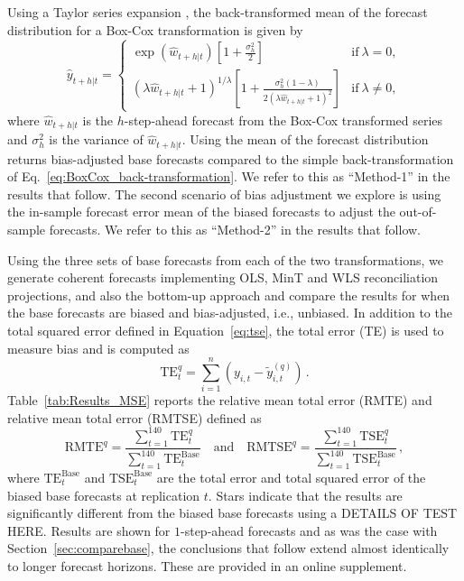 \documentclass[12pt]{article}
\theoremstyle{definition}
\begin{document}
Using a Taylor series expansion \citep{guerrero1993time}, the back-transformed mean of the forecast distribution for a Box-Cox transformation is given by
\begin{equation}\label{eq:BoxCox_BT_biasadj}
  \hat{y}_{t+h|t} =
    \begin{cases}
      \exp(\hat{w}_{t+h|t})\left[1+\frac{\sigma_h^2}{2}\right] & \text{if}~\lambda = 0, \\
      (\lambda \hat{w}_{t+h|t} + 1)^{1/\lambda}
        \left[1 + \frac{\sigma_h^2(1-\lambda)}{2(\lambda \hat{w}_{t+h|t} + 1)^2}\right]
                                                      & \text{if}~\lambda \ne 0,
\end{cases}
\end{equation}
where $\hat{w}_{t+h|t}$ is the $h$-step-ahead forecast from the Box-Cox transformed series and $\sigma_h^2$ is the variance of $\hat{w}_{t+h|t}$. Using the mean of the forecast distribution returns bias-adjusted base forecasts compared to the simple back-transformation of Eq.~\eqref{eq:BoxCox_back-transformation}. We refer to this as ``Method-1'' in the results that follow. The second scenario of bias adjustment we explore is using the in-sample forecast error mean of the biased forecasts to adjust the out-of-sample forecasts. We refer to this as ``Method-2'' in the results that follow.

Using the three sets of base forecasts from each of the two transformations, we generate coherent forecasts implementing OLS, MinT and WLS reconciliation projections, and also the bottom-up approach and compare the results for when the base forecasts are biased and bias-adjusted, i.e., unbiased. {\color{blue} In addition to the total squared error defined in Equation~\ref{eq:tse}, the total error (TE) is used to measure bias and is computed as
\begin{equation*}
\textrm{TE}^{q}_t=\sum\limits_{i=1}^n(y_{i,t}-\tilde{y}^{(q)}_{i,t})\,.
\end{equation*}
Table~\ref{tab:Results_MSE} reports the relative mean total error (RMTE) and relative mean total error (RMTSE) defined as  
\begin{equation*}
\textrm{RMTE}^{q}=\frac{\sum\limits_{t=1}^{140}\textrm{TE}^{q}_t}{\sum\limits_{t=1}^{140}\textrm{TE}^{\textrm{Base}}_t}\quad \textrm {and}\quad \textrm{RMTSE}^{q}=\frac{\sum\limits_{t=1}^{140}\textrm{TSE}^{q}_t}{\sum\limits_{t=1}^{140}\textrm{TSE}^{\textrm{Base}}_t}\,,
\end{equation*}
where $\textrm{TE}^{\textrm{Base}}_t$ and $\textrm{TSE}^{\textrm{Base}}_t$ are the total error and total squared error of the biased base forecasts at replication $t$.  Stars indicate that the results are significantly different from the biased base forecasts using a DETAILS OF TEST HERE.  Results are shown for $1$-step-ahead forecasts and} as was the case with Section~\ref{sec:comparebase}, the conclusions that follow extend almost identically to longer forecast horizons. {\color{blue} These are provided in an online supplement}.
\end{document}

